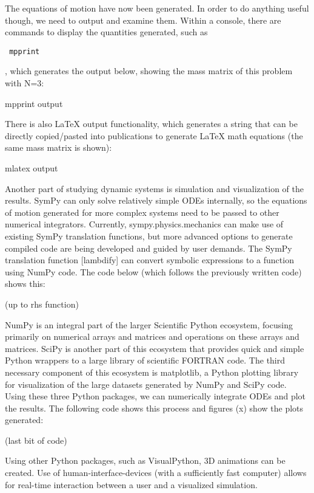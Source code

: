 \documentclass[twocolumn,10pt]{asme2e}
\begin{document}
The equations of motion have now been generated.
In order to do anything useful though, we need to output and examine them.
Within a console, there are commands to display the quantities generated, such
as \begin{verbatim} mpprint \end{verbatim}, which generates the output below, showing the mass matrix of this
problem with N=3:

mpprint output

There is also LaTeX output functionality, which generates a string that can be
directly copied/pasted into publications to generate LaTeX math equations (the
same mass matrix is shown):

mlatex output

Another part of studying dynamic systems is simulation and visualization of the
results.
SymPy can only solve relatively simple ODEs internally, so the equations of
motion generated for more complex systems need to be passed to other numerical
integrators.
Currently, sympy.physics.mechanics can make use of existing SymPy translation
functions, but more advanced options to generate compiled code are being
developed and guided by user demands.
The SymPy translation function [lambdify] can convert symbolic expressions to a
function using NumPy code.
The code below (which follows the previously written code) shows this:

(up to rhs function)

NumPy is an integral part of the larger Scientific Python ecosystem, focusing
primarily on numerical arrays and matrices and operations on these arrays and
matrices.
SciPy is another part of this ecosystem that provides quick and simple Python
wrappers to a large library of scientific FORTRAN code.
The third necessary component of this ecosystem is matplotlib, a Python
plotting library for visualization of the large datasets generated by NumPy and
SciPy code.
Using these three Python packages, we can numerically integrate ODEs and plot
the results.
The following code shows this process and figures (x) show the plots generated:

(last bit of code)

Using other Python packages, such as VisualPython, 3D animations can be
created.
Use of human-interface-devices (with a sufficiently fast computer) allows for
real-time interaction between a user and a visualized simulation.
\end{document}
